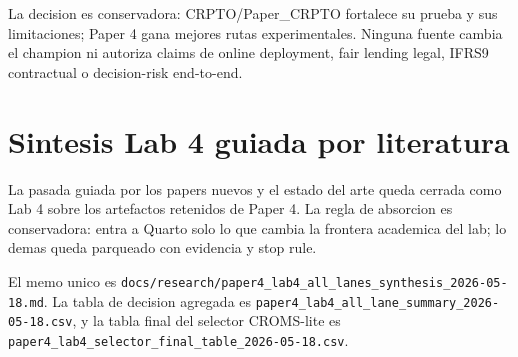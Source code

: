 \documentclass[
  spanish,
  11pt,
  letterpaper,
]{scrbook}
\theoremstyle{plain}
\theoremstyle{remark}
\begin{document}
La decision es conservadora: CRPTO/Paper\_CRPTO fortalece su prueba y
sus limitaciones; Paper 4 gana mejores rutas experimentales. Ninguna
fuente cambia el champion ni autoriza claims de online deployment, fair
lending legal, IFRS9 contractual o decision-risk end-to-end.

\section{Sintesis Lab 4 guiada por
literatura}\label{sintesis-lab-4-guiada-por-literatura}

La pasada guiada por los papers nuevos y el estado del arte queda
cerrada como Lab 4 sobre los artefactos retenidos de Paper 4. La regla
de absorcion es conservadora: entra a Quarto solo lo que cambia la
frontera academica del lab; lo demas queda parqueado con evidencia y
stop rule.

El memo unico es
\texttt{docs/research/paper4\_lab4\_all\_lanes\_synthesis\_2026-05-18.md}.
La tabla de decision agregada es
\texttt{paper4\_lab4\_all\_lane\_summary\_2026-05-18.csv}, y la tabla
final del selector CROMS-lite es
\texttt{paper4\_lab4\_selector\_final\_table\_2026-05-18.csv}.
\end{document}
